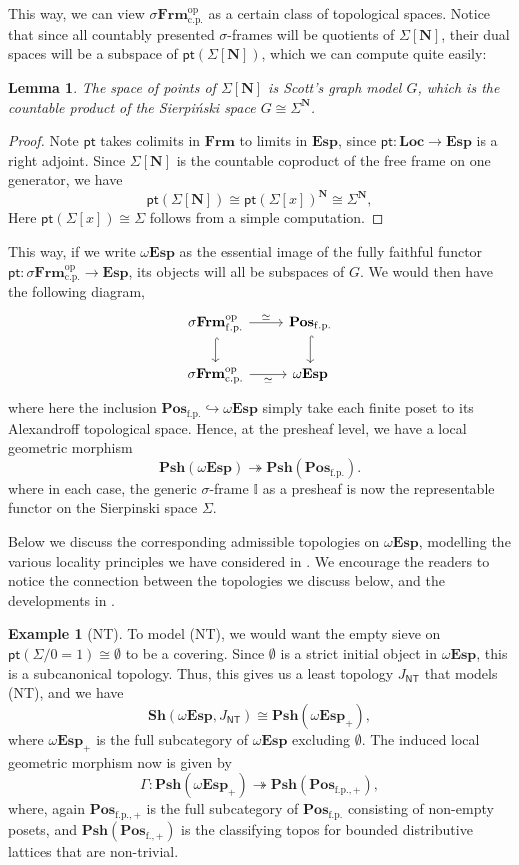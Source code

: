 \documentclass[a4paper,12pt]{amsart}
\newtheorem{lemma}[theorem]{Lemma}
\theoremstyle{definition}
\newtheorem{example}[theorem]{Example}
\newcommand{\mb}[1]{\mathbf{#1}}
\newcommand{\mbb}[1]{\mathbb{#1}}
\newcommand{\I}{\mbb I}
\newcommand{\mr}[1]{\mathrm{#1}}
\newcommand{\ms}[1]{\mathsf{#1}}
\newcommand{\Pos}{\mb{Pos}}
\newcommand{\sh}{\mb{Sh}}
\newcommand{\psh}{\mb{Psh}}
\newcommand{\op}{^{\mathrm{op}}}
\newcommand{\surj}{\twoheadrightarrow}
\newcommand{\hook}{\hookrightarrow}
\newcommand{\fp}{_{\mr{f.p.}}}
\newcommand{\cp}{_{\mr{c.p.}}}
\newcommand{\N}{\mb N}
\newcommand{\emp}{\emptyset}
\newcommand{\pt}{\ms{pt}}
\newcommand{\sFrm}{\sigma\mb{Frm}}
\newcommand{\Frm}{\mb{Frm}}
\newcommand{\Loc}{\mb{Loc}}
\newcommand{\Topp}{\mb{Esp}}
\newcommand{\wTop}{\omega\mb{Esp}}
\begin{document}
This way, we can view $\sFrm\cp\op$ as a certain class of topological spaces. Notice that since all countably presented $\sigma$-frames will be quotients of $\Sigma[\N]$, their dual spaces will be a subspace of $\pt(\Sigma[\N])$, which we can compute quite easily:

\begin{lemma}
  The space of points of $\Sigma[\N]$ is Scott's graph model $G$, which is the countable product of the Sierpi\'nski space $G \cong \Sigma^\N$.
\end{lemma}
\begin{proof}
  Note $\pt$ takes colimits in $\Frm$ to limits in $\Topp$, since $\pt \colon \Loc \to \Topp$ is a right adjoint. Since $\Sigma[\N]$ is the countable coproduct of the free frame on one generator, we have
  \[ \pt(\Sigma[\N]) \cong \pt(\Sigma[x])^\N \cong \Sigma^\N, \]
  Here $\pt(\Sigma[x]) \cong \Sigma$ follows from a simple computation.
\end{proof}

This way, if we write $\wTop$ as the essential image of the fully faithful functor $\pt \colon \sFrm\cp\op \to \Topp$, its objects will all be subspaces of $G$. We would then have the following diagram,
\[
\begin{tikzcd}
  \sFrm\fp\op \ar[d, hook] \ar[r, "\simeq"] & \Pos\fp \ar[d, hook] \\
  \sFrm\cp\op \ar[r, "\simeq"'] & \wTop
\end{tikzcd}
\]
where here the inclusion $\Pos\fp \hook \wTop$ simply take each finite poset to its Alexandroff topological space. Hence, at the presheaf level, we have a local geometric morphism
\[ \psh(\wTop) \surj \psh(\Pos\fp). \]
where in each case, the generic $\sigma$-frame $\I$ as a presheaf is now the representable functor on the Sierpinski space $\Sigma$. 

Below we discuss the corresponding admissible topologies on $\wTop$, modelling the various locality principles we have considered in . We encourage the readers to notice the connection between the topologies we discuss below, and the developments in .

\begin{example}[NT]
  To model (NT), we would want the empty sieve on $\pt(\Sigma/0=1) \cong \emp$ to be a covering. Since $\emp$ is a strict initial object in $\wTop$, this is a subcanonical topology. Thus, this gives us a least topology $J_{\ms{NT}}$ that models (NT), and we have
  \[ \sh(\wTop,J_{\ms{NT}}) \cong \psh(\wTop_+), \]
  where $\wTop_+$ is the full subcategory of $\wTop$ excluding $\emp$. The induced local geometric morphism now is given by 
  \[ \Gamma \colon \psh(\wTop_+) \surj \psh(\Pos_{\mr{f.p.,+}}), \]
  where, again $\Pos_{\mr{f.p.,+}}$ is the full subcategory of $\Pos_{\mr{f.p.}}$ consisting of non-empty posets, and $\psh(\Pos_{\mr{f.,+}})$ is the classifying topos for bounded distributive lattices that are non-trivial.
\end{example}
\end{document}
